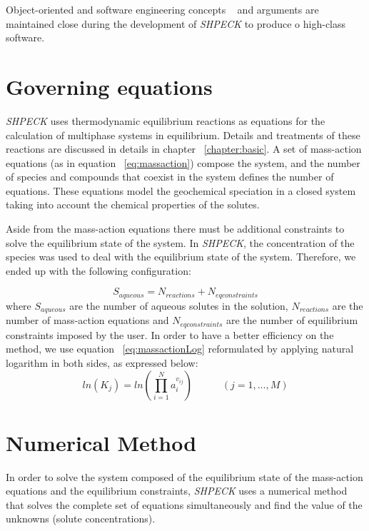 Object-oriented and software engineering concepts ~\cite{Meyer:00}   and arguments are maintained close during the development of \emph{SHPECK} to produce o high-class software.

\section{Governing equations}

\emph{SHPECK} uses thermodynamic equilibrium reactions as equations for the calculation of multiphase systems in equilibrium. Details and treatments of these reactions are discussed in details in chapter ~\ref{chapter:basic}. A set of mass-action equations (as in equation ~\ref{eq:massaction}) compose the system, and the number of species and compounds that coexist in the system defines the number of equations. These equations model the geochemical speciation in a closed system taking into account the chemical properties of the solutes.

Aside from the mass-action equations there must be additional constraints to solve the equilibrium state of the system. In \emph{SHPECK}, the concentration of the species was used to deal with the equilibrium state of the system. Therefore, we ended up with the following configuration:

\begin{equation}\label{eq:configuration}
S_{aqueous} = N_{reactions} + N_{eq constraints}
\end{equation}
where $S_{aqueous}$ are the number of aqueous solutes in the solution, $N_{reactions}$ are the number of mass-action equations and $N_{eq constraints}$ are the number of equilibrium constraints imposed by the user. 
In order to have a better efficiency on the method, we use equation ~\ref{eq:massactionLog} reformulated by applying natural logarithm in both sides, as expressed below:
\begin{equation}\label{eq:massactionLog}
ln({K_j}) =  ln({\prod\limits_{i=1}^N  a_i^{v_{ij}}}) \hspace{35pt}    (j = 1, ... , M)
\end{equation}

\section{Numerical Method}
In order to solve the system composed of the equilibrium state of the mass-action equations and the equilibrium constraints, \emph{SHPECK} uses a numerical method that solves the complete set of equations simultaneously and find the value of the unknowns (solute concentrations).


